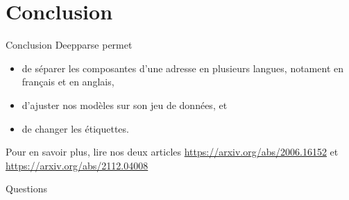 \documentclass{beamer}
\begin{document}
	\section{Conclusion}
	\begin{frame}{Conclusion}
		Deepparse permet
		\begin{itemize}
			\item de séparer les composantes d'une adresse en plusieurs langues, notament en français et en anglais,
			\item d'ajuster nos modèles sur son jeu de données, et
			\item de changer les étiquettes.
		\end{itemize}		
		Pour en savoir plus, lire nos deux articles \url{https://arxiv.org/abs/2006.16152} et \url{https://arxiv.org/abs/2112.04008}
	\end{frame}
	
	\begin{frame}{Questions}
		\centering
		\fontsize{100}{100}\faQuestion
	\end{frame}
	
	
\end{document}
